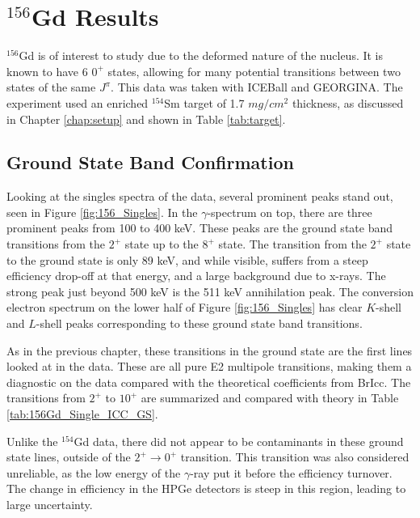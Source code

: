 \chapter{$^{156}$Gd Results}

$^{156}$Gd is of interest to study due to the deformed nature of the nucleus. It is known to have 6 $0^+$ states, allowing for many potential transitions between two states of the same $J^\pi$. This data was taken with ICEBall and GEORGINA. The experiment used an enriched $^{154}$Sm target of 1.7 $mg/cm^2$ thickness, as discussed in Chapter \ref{chap:setup} and shown in Table \ref{tab:target}.

\section{Ground State Band Confirmation}

Looking at the singles spectra of the data, several prominent peaks stand out, seen in Figure \ref{fig:156_Singles}. In the $\gamma$-spectrum on top, there are three prominent peaks from 100 to 400 keV. These peaks are the ground state band transitions from the $2^+$ state up to the $8^+$ state. The transition from the $2^+$ state to the ground state is only 89 keV, and while visible, suffers from a steep efficiency drop-off at that energy, and a large background due to x-rays. The strong peak just beyond 500 keV is the 511 keV annihilation peak. The conversion electron spectrum on the lower half of Figure \ref{fig:156_Singles} has clear $K$-shell and $L$-shell peaks corresponding to these ground state band transitions. 



As in the previous chapter, these transitions in the ground state are the first lines looked at in the data. These are all pure E2 multipole transitions, making them a diagnostic on the data compared with the theoretical coefficients from BrIcc\citep{kibedi08:_BRICC}. The transitions from $2^+$ to $10^+$ are summarized and compared with theory in Table \ref{tab:156Gd_Single_ICC_GS}.



Unlike the $^{154}$Gd data, there did not appear to be contaminants in these ground state lines, outside of the $2^+\rightarrow0^+$ transition. This transition was also considered unreliable, as the low energy of the $\gamma$-ray put it before the efficiency turnover. The change in efficiency in the HPGe detectors is steep in this region, leading to large uncertainty.


